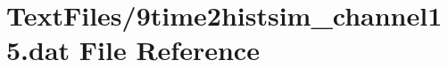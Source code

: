 \hypertarget{9time2histsim__channel15_8dat}{}\section{Text\+Files/9time2histsim\+\_\+channel15.dat File Reference}
\label{9time2histsim__channel15_8dat}
